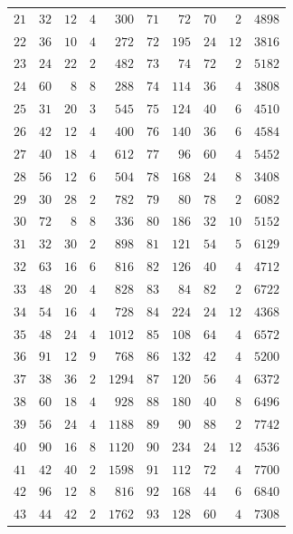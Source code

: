 \documentclass[11pt,a4paper]{article}
\theoremstyle{definition}
\begin{document}
\begin{longtable}{rrrrr@{\hskip 2em}rrrrr}
$21$ & $32$ & $12$ & $4$ & $300$ & $71$ & $72$ & $70$ & $2$ & $4898$ \\
$22$ & $36$ & $10$ & $4$ & $272$ & $72$ & $195$ & $24$ & $12$ & $3816$ \\
$23$ & $24$ & $22$ & $2$ & $482$ & $73$ & $74$ & $72$ & $2$ & $5182$ \\
$24$ & $60$ & $8$ & $8$ & $288$ & $74$ & $114$ & $36$ & $4$ & $3808$ \\
$25$ & $31$ & $20$ & $3$ & $545$ & $75$ & $124$ & $40$ & $6$ & $4510$ \\
$26$ & $42$ & $12$ & $4$ & $400$ & $76$ & $140$ & $36$ & $6$ & $4584$ \\
$27$ & $40$ & $18$ & $4$ & $612$ & $77$ & $96$ & $60$ & $4$ & $5452$ \\
$28$ & $56$ & $12$ & $6$ & $504$ & $78$ & $168$ & $24$ & $8$ & $3408$ \\
$29$ & $30$ & $28$ & $2$ & $782$ & $79$ & $80$ & $78$ & $2$ & $6082$ \\
$30$ & $72$ & $8$ & $8$ & $336$ & $80$ & $186$ & $32$ & $10$ & $5152$ \\
$31$ & $32$ & $30$ & $2$ & $898$ & $81$ & $121$ & $54$ & $5$ & $6129$ \\
$32$ & $63$ & $16$ & $6$ & $816$ & $82$ & $126$ & $40$ & $4$ & $4712$ \\
$33$ & $48$ & $20$ & $4$ & $828$ & $83$ & $84$ & $82$ & $2$ & $6722$ \\
$34$ & $54$ & $16$ & $4$ & $728$ & $84$ & $224$ & $24$ & $12$ & $4368$ \\
$35$ & $48$ & $24$ & $4$ & $1012$ & $85$ & $108$ & $64$ & $4$ & $6572$ \\
$36$ & $91$ & $12$ & $9$ & $768$ & $86$ & $132$ & $42$ & $4$ & $5200$ \\
$37$ & $38$ & $36$ & $2$ & $1294$ & $87$ & $120$ & $56$ & $4$ & $6372$ \\
$38$ & $60$ & $18$ & $4$ & $928$ & $88$ & $180$ & $40$ & $8$ & $6496$ \\
$39$ & $56$ & $24$ & $4$ & $1188$ & $89$ & $90$ & $88$ & $2$ & $7742$ \\
$40$ & $90$ & $16$ & $8$ & $1120$ & $90$ & $234$ & $24$ & $12$ & $4536$ \\
$41$ & $42$ & $40$ & $2$ & $1598$ & $91$ & $112$ & $72$ & $4$ & $7700$ \\
$42$ & $96$ & $12$ & $8$ & $816$ & $92$ & $168$ & $44$ & $6$ & $6840$ \\
$43$ & $44$ & $42$ & $2$ & $1762$ & $93$ & $128$ & $60$ & $4$ & $7308$ \\

\end{longtable}
\end{document}
